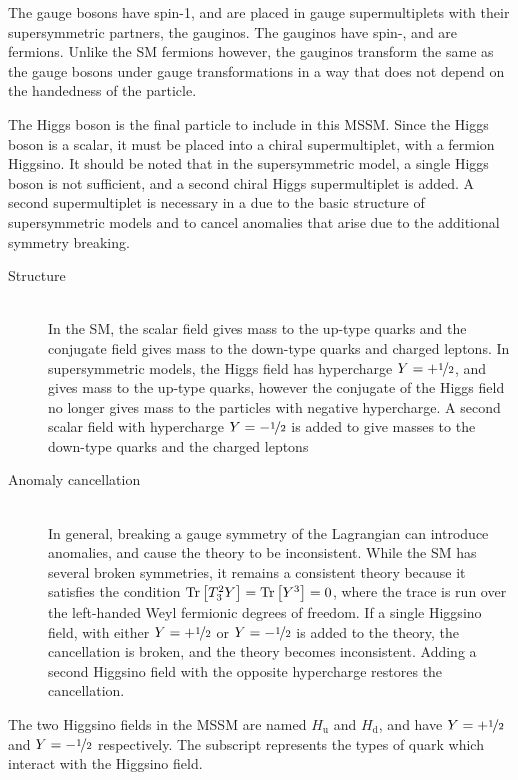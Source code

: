 The gauge bosons have spin-1, and are placed in gauge supermultiplets with
their supersymmetric partners, the gauginos.
The gauginos have spin-, and are fermions.
Unlike the SM fermions however, the gauginos transform the same as the gauge
bosons under gauge transformations in a way that does not depend on the
handedness of the particle.

The Higgs boson is the final particle to include in this MSSM.
Since the Higgs boson is a scalar, it must be placed into a chiral
supermultiplet, with a fermion Higgsino.
It should be noted that in the supersymmetric model, a single Higgs boson is
not sufficient, and a second chiral Higgs supermultiplet is added.
A second supermultiplet is necessary in a due to the basic structure of
supersymmetric models and to cancel anomalies that arise due to the additional
symmetry breaking.
\begin{description}
  \item[Structure] \hfill \\
    In the SM, the scalar field gives mass to the
    up-type quarks and the conjugate field gives mass to the down-type quarks
    and charged leptons.
    In supersymmetric models, the Higgs field has hypercharge
    $Y=+\nicefrac{1}{2}$, and gives mass to the up-type quarks, however the
    conjugate of the Higgs field no longer gives mass to the particles with
    negative hypercharge.
    A second scalar field with hypercharge $Y=-\nicefrac{1}{2}$ is added to
    give masses to the down-type quarks and the charged leptons
  \item[Anomaly cancellation] \hfill \\
    In general, breaking a gauge symmetry of the Lagrangian can introduce
    anomalies, and cause the theory to be inconsistent.
    While the SM has several broken symmetries, it remains a consistent theory
    because it satisfies the condition
    $\Tr\left[ T_3^2 Y \right] = \Tr\left[ Y^3 \right] = 0$, where the trace
    is run over the left-handed Weyl fermionic degrees of freedom.
    If a single Higgsino field, with either $Y=+\nicefrac{1}{2}$ or
    $Y=-\nicefrac{1}{2}$ is added to the theory, the cancellation is broken,
    and the theory becomes inconsistent.
    Adding a second Higgsino field with the opposite hypercharge restores the
    cancellation.
\end{description}
The two Higgsino fields in the MSSM are named $H_\mathrm{u}$ and $H_\mathrm{d}$,
and have $Y=+\nicefrac{1}{2}$ and $Y=-\nicefrac{1}{2}$ respectively.
The subscript represents the types of quark which interact with the Higgsino
field.


